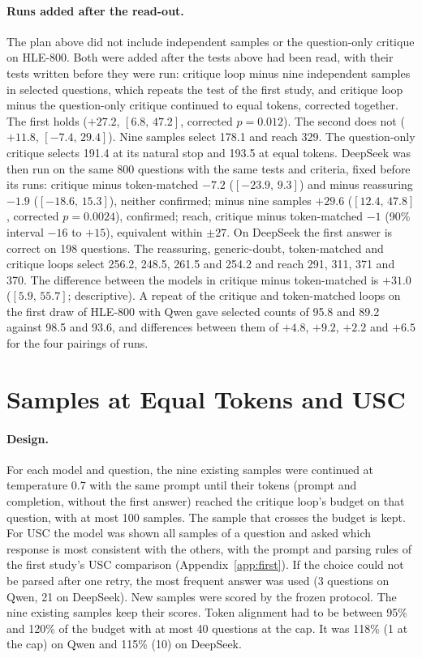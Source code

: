\documentclass[11pt]{article}
\newcommand{\ds}{DeepSeek}
\newcommand{\qw}{Qwen}
\newcommand{\ci}[2]{$[#1,\,#2]$}
\begin{document}
\paragraph{Runs added after the read-out.}
The plan above did not include independent samples or the question-only critique on HLE-800.
Both were added after the tests above had been read, with their tests written before they were run: critique loop minus nine independent samples in selected questions, which repeats the test of the first study, and critique loop minus the question-only critique continued to equal tokens, corrected together.
The first holds ($+27.2$, \ci{6.8}{47.2}, corrected $p=0.012$). The second does not ($+11.8$, \ci{-7.4}{29.4}).
Nine samples select 178.1 and reach 329. The question-only critique selects 191.4 at its natural stop and 193.5 at equal tokens.
\ds{} was then run on the same 800 questions with the same tests and criteria, fixed before its runs: critique minus token-matched $-7.2$ (\ci{-23.9}{9.3}) and minus reassuring $-1.9$ (\ci{-18.6}{15.3}), neither confirmed; minus nine samples $+29.6$ (\ci{12.4}{47.8}, corrected $p=0.0024$), confirmed; reach, critique minus token-matched $-1$ (90\% interval $-16$ to $+15$), equivalent within $\pm27$.
On \ds{} the first answer is correct on 198 questions. The reassuring, generic-doubt, token-matched and critique loops select 256.2, 248.5, 261.5 and 254.2 and reach 291, 311, 371 and 370.
The difference between the models in critique minus token-matched is $+31.0$ (\ci{5.9}{55.7}; descriptive).
A repeat of the critique and token-matched loops on the first draw of HLE-800 with \qw{} gave selected counts of 95.8 and 89.2 against 98.5 and 93.6, and differences between them of $+4.8$, $+9.2$, $+2.2$ and $+6.5$ for the four pairings of runs.

\section{Samples at Equal Tokens and USC}
\label{app:e2}

\paragraph{Design.}
For each model and question, the nine existing samples were continued at temperature 0.7 with the same prompt until their tokens (prompt and completion, without the first answer) reached the critique loop's budget on that question, with at most 100 samples. The sample that crosses the budget is kept.
For USC the model was shown all samples of a question and asked which response is most consistent with the others, with the prompt and parsing rules of the first study's USC comparison (Appendix~\ref{app:first}). If the choice could not be parsed after one retry, the most frequent answer was used (3 questions on \qw, 21 on \ds).
New samples were scored by the frozen protocol. The nine existing samples keep their scores.
Token alignment had to be between 95\% and 120\% of the budget with at most 40 questions at the cap. It was 118\% (1 at the cap) on \qw{} and 115\% (10) on \ds.
\end{document}
